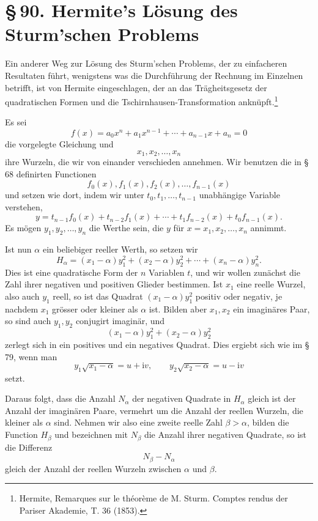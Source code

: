 \documentclass[11pt]{article}
\providecommand{\ii}{\mathrm{i}}
\providecommand{\sect}[2]{\section*{\S\,#1. #2}}
\begin{document}
\clearpage
\sect{90}{Hermite's Lösung des Sturm'schen Problems}

Ein anderer Weg zur Lösung des Sturm'schen Problems, der zu einfacheren Resultaten führt, wenigstens was die Durchführung der Rechnung im Einzelnen betrifft, ist von Hermite eingeschlagen, der an das Trägheitsgesetz der quadratischen Formen und die Tschirnhausen-Transformation anknüpft.\footnote{Hermite, Remarques sur le théorème de M. Sturm. Comptes rendus der Pariser Akademie, T. 36 (1853).}

Es sei
\begin{equation}
f(x)=a_0x^n+a_1x^{n-1}+\cdots+a_{n-1}x+a_n=0
\tag{1}
\end{equation}
die vorgelegte Gleichung und
\begin{equation}
x_1,x_2,\ldots,x_n
\tag{2}
\end{equation}
ihre Wurzeln, die wir von einander verschieden annehmen. Wir benutzen die in \S\,68 definirten Functionen
\begin{equation}
f_0(x),f_1(x),f_2(x),\ldots,f_{n-1}(x)
\tag{3}
\end{equation}
und setzen wie dort, indem wir unter $t_0,t_1,\ldots,t_{n-1}$ unabhängige Variable verstehen,
\begin{equation}
y=t_{n-1}f_0(x)+t_{n-2}f_1(x)+\cdots+t_1f_{n-2}(x)+t_0f_{n-1}(x).
\tag{4}
\end{equation}
Es mögen $y_1,y_2,\ldots,y_n$ die Werthe sein, die $y$ für $x=x_1,x_2,\ldots,x_n$ annimmt.

Ist nun $\alpha$ ein beliebiger reeller Werth, so setzen wir
\begin{equation}
H_\alpha=(x_1-\alpha)y_1^2+(x_2-\alpha)y_2^2+\cdots+(x_n-\alpha)y_n^2.
\tag{5}
\end{equation}
Dies ist eine quadratische Form der $n$ Variablen $t$, und wir wollen zunächst die Zahl ihrer negativen und positiven Glieder bestimmen. Ist $x_1$ eine reelle Wurzel, also auch $y_1$ reell, so ist das Quadrat $(x_1-\alpha)y_1^2$ positiv oder negativ, je nachdem $x_1$ grösser oder kleiner als $\alpha$ ist. Bilden aber $x_1,x_2$ ein imaginäres Paar, so sind auch $y_1,y_2$ conjugirt imaginär, und
\[
        (x_1-\alpha)y_1^2+(x_2-\alpha)y_2^2
\]
zerlegt sich in ein positives und ein negatives Quadrat. Dies ergiebt sich wie im \S\,79, wenn man
\[
        y_1\sqrt{x_1-\alpha}=u+\ii v,
        \qquad
        y_2\sqrt{x_2-\alpha}=u-\ii v
\]
setzt.

Daraus folgt, dass die Anzahl $N_\alpha$ der negativen Quadrate in $H_\alpha$ gleich ist der Anzahl der imaginären Paare, vermehrt um die Anzahl der reellen Wurzeln, die kleiner als $\alpha$ sind. Nehmen wir also eine zweite reelle Zahl $\beta>\alpha$, bilden die Function $H_\beta$ und bezeichnen mit $N_\beta$ die Anzahl ihrer negativen Quadrate, so ist die Differenz
\[
        N_\beta-N_\alpha
\]
gleich der Anzahl der reellen Wurzeln zwischen $\alpha$ und $\beta$.
\end{document}

